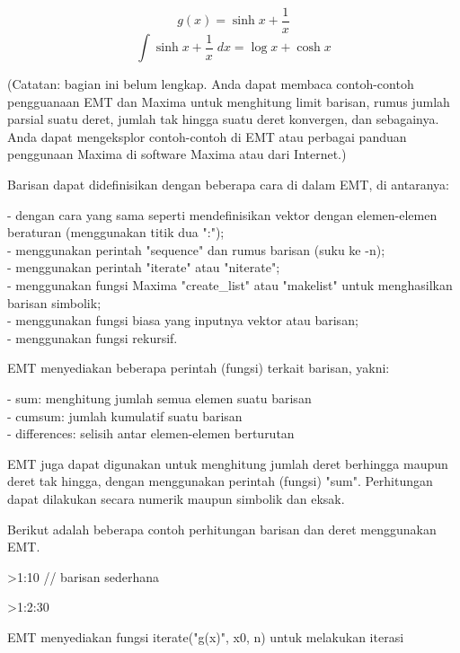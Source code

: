 \documentclass[a4paper,10pt]{article}
\begin{document}
\begin{eulernotebook}
\begin{eulerprompt}
\end{eulerprompt}
\begin{eulerformula}
\[
g\left(x\right)=\sinh x+\frac{1}{x}
\]
\[
\int {\sinh x+\frac{1}{x}}{\;dx}=\log x+\cosh x
\]
\end{eulerformula}
\begin{eulercomment}
(Catatan: bagian ini belum lengkap. Anda dapat membaca contoh-contoh
pengguanaan EMT dan Maxima untuk menghitung limit barisan, rumus
jumlah parsial suatu deret, jumlah tak hingga suatu deret konvergen,
dan sebagainya. Anda dapat mengeksplor contoh-contoh di EMT atau
perbagai panduan penggunaan Maxima di software Maxima atau dari
Internet.)

Barisan dapat didefinisikan dengan beberapa cara di dalam EMT, di
antaranya:

- dengan cara yang sama seperti mendefinisikan vektor dengan
elemen-elemen beraturan (menggunakan titik dua ":");\\
- menggunakan perintah "sequence" dan rumus barisan (suku ke -n);\\
- menggunakan perintah "iterate" atau "niterate";\\
- menggunakan fungsi Maxima "create\_list" atau "makelist" untuk
menghasilkan barisan simbolik;\\
- menggunakan fungsi biasa yang inputnya vektor atau barisan;\\
- menggunakan fungsi rekursif.

EMT menyediakan beberapa perintah (fungsi) terkait barisan, yakni:

- sum: menghitung jumlah semua elemen suatu barisan\\
- cumsum: jumlah kumulatif suatu barisan\\
- differences: selisih antar elemen-elemen berturutan

EMT juga dapat digunakan untuk menghitung jumlah deret berhingga
maupun deret tak hingga, dengan menggunakan perintah (fungsi) "sum".
Perhitungan dapat dilakukan secara numerik maupun simbolik dan eksak.

Berikut adalah beberapa contoh perhitungan barisan dan deret
menggunakan EMT.
\end{eulercomment}
\begin{eulerprompt}
>1:10 // barisan sederhana
\end{eulerprompt}
\begin{euleroutput}
  [1,  2,  3,  4,  5,  6,  7,  8,  9,  10]
\end{euleroutput}
\begin{eulerprompt}
>1:2:30
\end{eulerprompt}
\begin{euleroutput}
  [1,  3,  5,  7,  9,  11,  13,  15,  17,  19,  21,  23,  25,  27,  29]
\end{euleroutput}
\begin{eulercomment}
EMT menyediakan fungsi iterate("g(x)", x0, n) untuk melakukan iterasi


\end{eulercomment}
\end{eulernotebook}
\end{document}
